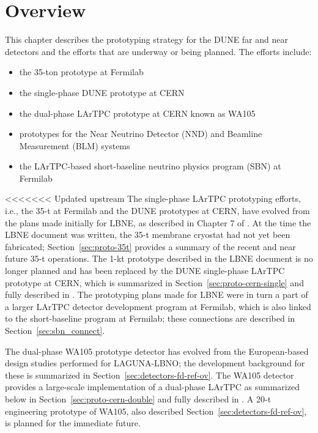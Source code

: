 \section{Overview}
\label{sec:proto-overview}


This chapter describes the prototyping strategy for the DUNE  far and near detectors and the efforts that are underway or being planned.  The efforts include:
\begin{itemize}
\item the 35-ton prototype at Fermilab
\item the single-phase DUNE prototype at CERN
\item the dual-phase LArTPC prototype at CERN known as WA105
\item prototypes for the Near Neutrino Detector (NND) and Beamline Measurement (BLM) systems
\item the LArTPC-based short-baseline neutrino physics program (SBN) at Fermilab
\end{itemize}

<<<<<<< Updated upstream
The single-phase LArTPC prototyping efforts, i.e., the 35-t at
Fermilab and the DUNE prototypes at CERN, have evolved from the plans
made initially for LBNE, as described in Chapter 7 of \anxlbnefd.  At
the time the LBNE document was written, the 35-t membrane cryostat had
not yet been fabricated; Section~\ref{sec:proto-35t} provides a
summary of the recent and near future 35-t operations.  The 1-kt
prototype described in the LBNE document is no longer planned and has
been replaced by the DUNE single-phase LArTPC prototype at CERN, which
is summarized in Section~\ref{sec:proto-cern-single} and fully
described in \anxcernproto.  The prototyping plans made for LBNE were
in turn a part of a larger LArTPC detector development program at
Fermilab, which is also linked to the short-baseline program at
Fermilab; these connections are described in
Section~\ref{sec:sbn_connect}.

The dual-phase WA105 prototype detector has evolved from the
European-based design studies performed for LAGUNA-LBNO; the
development background for these is summarized in
Section~\ref{sec:detectors-fd-ref-ov}.  The WA105 detector provides a
large-scale implementation of a dual-phase LArTPC 
as summarized below in
Section~\ref{sec:proto-cern-double} and fully described in
\anxdualtdr.  A 20-t engineering prototype of WA105, also described
Section~\ref{sec:detectors-fd-ref-ov}, is planned for the immediate
future.

